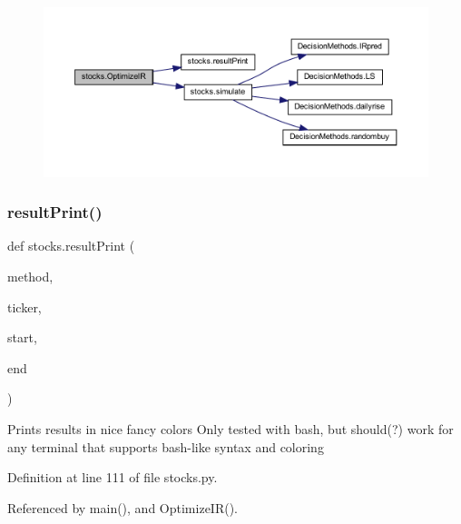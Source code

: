 \begin{figure}[H]
\begin{center}
\leavevmode
\includegraphics[width=350pt]{namespacestocks_a001673a0b7e5f0867197d97fea8a251b_cgraph}
\end{center}
\end{figure}
\hypertarget{namespacestocks_ac80b7d5d1cdc027b7a0e2e19093baf9b}{}\label{namespacestocks_ac80b7d5d1cdc027b7a0e2e19093baf9b} 
\subsubsection{\texorpdfstring{result\+Print()}{resultPrint()}}
{\footnotesize\ttfamily def stocks.\+result\+Print (\begin{DoxyParamCaption}\item[{}]{method,  }\item[{}]{ticker,  }\item[{}]{start,  }\item[{}]{end }\end{DoxyParamCaption})}

\begin{DoxyVerb}Prints results in nice fancy colors
Only tested with bash, but should(?) work for any terminal that
supports bash-like syntax and coloring
\end{DoxyVerb}
 

Definition at line 111 of file stocks.\+py.



Referenced by main(), and Optimize\+I\+R().


